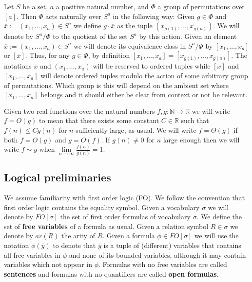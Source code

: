 \documentclass[12pt,notitlepage,a4paper]{article}
\theoremstyle{definition}
\newcommand{\R}{\mathbb{R}}
\newcommand{\N}{\mathbb{N}}
\newcommand{\Ln}{\lim\limits_{n\to \infty}}
\begin{document}
Let $S$ be a set, $a$ a positive natural number, 
and $\Phi$ a group of permutations over 
$[a]$. Then $\Phi$ acts naturally over
$S^a$ in the following way: Given $g\in \Phi$ and
$\overline{x}:=(x_1,\dots,x_a)\in S^a$ we define 
$g\cdot \overline{x}$ 
as the tuple $(x_{g(1)},\dots,x_{g(a)})$. 
We will denote by $S^a/\Phi$ to the quotient
of the set $S^a$ by this action. Given an element
$\overline{x}:=(x_1,\dots, x_a)\in S^a$ we will denote its equivalence
class in $S^a/\Phi$ by $[x_1,\dots,x_a]$ or $[\overline{x}]$.
Thus, for any
$g\in \Phi$, by definition $[x_1,\dots,x_a]=[x_{g(1)}
,\dots,x_{g(a)}]$. The notations $\overline{x}$ and
$(x_1,\dots, x_a)$ 
will be reserved 
to ordered tuples while 
$[\overline{x}]$ and
$[x_1,\dots,x_a]$ will denote ordered tuples modulo the
action of some arbitrary group of permutations. Which group is
this will depend on the ambient set where $[x_1,\dots,x_a]$ belongs
and it should either be clear from context or not be relevant.\par

Given two real functions over the natural numbers 
$f,g:\N \rightarrow \R$ we will write $f=O(g)$ to 
mean that there exists some constant $C\in \R$
such that $f(n)\leq Cg(n)$ for $n$ sufficiently large, 
as usual. We will write $f=\Theta(g)$ if both $f=O(g)$ and
$g=O(f)$. If $g(n)\neq 0$ for $n$ large enough then
we will write $f\sim g$ when $\Ln \frac{f(n)}{g(n)}=1$. 




\subsection{Logical preliminaries}
We assume familiarity with first order logic (FO). We follow 
the convention that first order logic contains the equality symbol. 
Given a vocabulary $\sigma$ we will denote by $FO[\sigma]$ the set of 
first order formulas of vocabulary $\sigma$. We define the set of 
\textbf{free variables} of a formula as usual. 
Given a relation symbol $R\in \sigma$ we denote by $ar(R)$ the arity of $R$. 
Given a formula $\phi\in FO[\sigma]$ we will use the notation $\phi(\overline{y})$ 
to denote that $\overline{y}$ is a tuple of 
(different) variables that contains all free variables in $\phi$ and
none of its bounded variables, although it may contain variables
which not appear in $\phi$.
Formulas with no free variables are called \textbf{sentences} and 
formulas with no quantifiers are called \textbf{open formulas}. 
\end{document}
